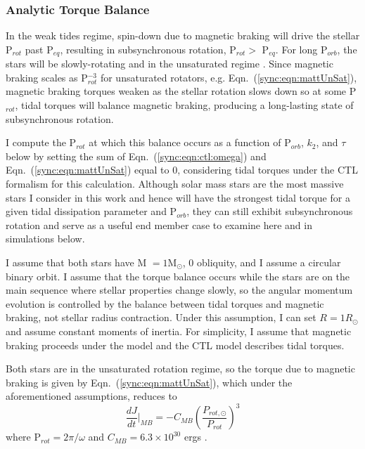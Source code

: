 \subsubsection{Analytic Torque Balance} \label{sync:sec:analytic}

In the weak tides regime, spin-down due to magnetic braking will drive the stellar P$_{rot}$ past P$_{eq}$, resulting in subsynchronous rotation, P$_{rot} >$ P$_{eq}$. For long P$_{orb}$, the stars will be slowly-rotating and in the unsaturated regime \citep{Matt2015}. Since magnetic braking scales as P$_{rot}^{-3}$ for unsaturated rotators, e.g. Eqn.~(\ref{sync:eqn:mattUnSat}), magnetic braking torques weaken as the stellar rotation slows down so at some P$_{rot}$, tidal torques will balance magnetic braking, producing a long-lasting state of subsynchronous rotation. 

I compute the P$_{rot}$ at which this balance occurs as a function of P$_{orb}$, $k_2$, and $\tau$ below by setting the sum of Eqn.~(\ref{sync:eqn:ctl:omega}) and Eqn.~(\ref{sync:eqn:mattUnSat}) equal to 0, considering tidal torques under the CTL formalism for this calculation.  Although solar mass stars are the most massive stars I consider in this work and hence will have the strongest tidal torque for a given tidal dissipation parameter and P$_{orb}$, they can still exhibit subsynchronous rotation and serve as a useful end member case to examine here and in simulations below.

I assume that both stars have M $= 1$M$_{\odot}$, 0 obliquity, and I assume a circular binary orbit. I assume that the torque balance occurs while the stars are on the main sequence where stellar properties change slowly, so the angular momentum evolution is controlled by the balance between tidal torques and magnetic braking, not stellar radius contraction. Under this assumption, I can set $R = 1 R_{\odot}$ and assume constant moments of inertia. For simplicity, I assume that magnetic braking proceeds under the \citet{Matt2015} model and the CTL model describes tidal torques.

Both stars are in the unsaturated rotation regime, so the torque due to magnetic braking is given by Eqn.~(\ref{sync:eqn:mattUnSat}), which under the aforementioned assumptions, reduces to
\begin{equation}
    \frac{dJ}{dt}\Bigg|_{MB} = -C_{MB} \left( \frac{P_{rot,\odot}}{P_{rot}} \right)^3
\end{equation}
where P$_{rot} = 2 \pi / \omega$ and $C_{MB} = 6.3 \times 10^{30}$ ergs \citep{Matt2015,Matt2019}.

